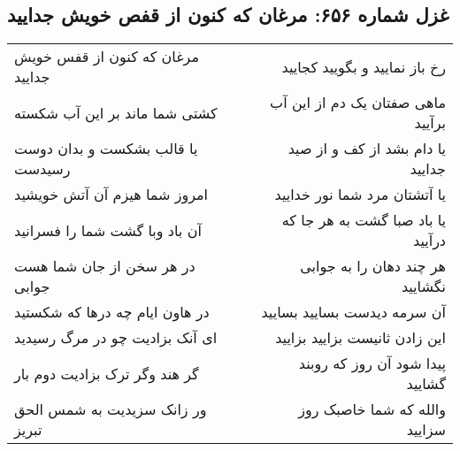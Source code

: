 \begin{center}
\section*{غزل شماره ۶۵۶: مرغان که کنون از قفص خویش جدایید}
\label{sec:0656}
\begin{longtable}{l p{0.5cm} r}
مرغان که کنون از قفس خویش جدایید
&&
رخ باز نمایید و بگویید کجایید
\\
کشتی شما ماند بر این آب شکسته
&&
ماهی صفتان یک دم از این آب برآیید
\\
یا قالب بشکست و بدان دوست رسیدست
&&
یا دام بشد از کف و از صید جدایید
\\
امروز شما هیزم آن آتش خویشید
&&
یا آتشتان مرد شما نور خدایید
\\
آن باد وبا گشت شما را فسرانید
&&
یا باد صبا گشت به هر جا که درآیید
\\
در هر سخن از جان شما هست جوابی
&&
هر چند دهان را به جوابی نگشایید
\\
در هاون ایام چه درها که شکستید
&&
آن سرمه دیدست بسایید بسایید
\\
ای آنک بزادیت چو در مرگ رسیدید
&&
این زادن ثانیست بزایید بزایید
\\
گر هند وگر ترک بزادیت دوم بار
&&
پیدا شود آن روز که روبند گشایید
\\
ور زانک سزیدیت به شمس الحق تبریز
&&
والله که شما خاصبک روز سزایید
\\
\end{longtable}
\end{center}
